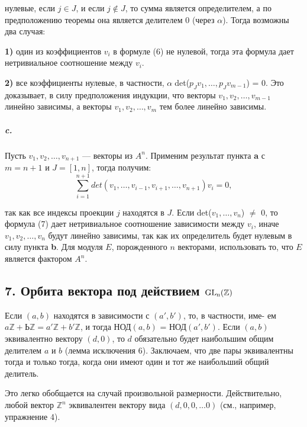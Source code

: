 {\noindent нулевые, если $j \in J$, и если $j \notin J$, то сумма является определителем, а
по предположению теоремы она является делителем 0 (через $\alpha$). Тогда
возможны два случая:

{\bf 1)} один из коэффициентов $v_{i}$ в формуле (6) не нулевой, тогда эта
формула дает нетривиальное соотношение между $v_{i}$.

{\bf 2)} все коэффициенты нулевые, в частности, $\alpha\;$det($p_{J}v_{1},\ldots,p_{J}v_{m-1}$)
= 0. Это доказывает, в силу предположения индукции, что векторы $v_1,v_2,\ldots,v_{m-1}$ линейно зависимы, а векторы $v_1,v_2,\ldots,v_{m}$
тем более линейно зависимы.

\subparagraph{c.} Пусть $v_1,v_2,\ldots,v_{n+1}$ — векторы из $A^{n}$. Применим результат
пункта {\bf a} с $m = n + 1$ и $J = [1,n]$, тогда получим:
\begin{equation}
\sum_{i=1}^{n+1} det(v_1,\ldots,v_{i-1},v_{i+1},\ldots,v_{n+1})v_{i} = 0,
\end{equation}

\newpage


\noindent так как все индексы проекции $j$ находятся в $J$. Если det($v_{1},\ldots,v_{n}$) $\neq$ 0, то формула (7) дает нетривиальное соотношение зависимости между $v_{i}$, иначе $v_1,v_2,\ldots,v_n$ будут линейно зависимы, так как их определитель будет нулевым в силу пункта {\bf b}. Для модуля $E$, порожденного $n$ векторами, использовать то, что $E$ является фактором $A^{n}$.

\subsection{\normalsize{7. Орбита вектора под действием $\rm{GL_n}(\mathbb {Z})$}}

Если $(a, b)$ находятся в зависимости с $(a',b')$, то, в частности, име-\linebreak
ем $a\mathbb {Z}+ Ь\mathbb {Z} = a'\mathbb {Z}+ b'\mathbb {Z}$, и тогда НОД$(a,b)$ = НОД$(a',b')$. Если $(a, b)$ эквивалентно вектору $(d, 0)$, то $d$ обязательно будет наибольшим общим делителем $a$ и $b$ (лемма исключения 6). Заключаем, что две пары эквивалентны тогда и только тогда, когда они имеют один и тот же наибольший общий делитель.

Это легко обобщается на случай произвольной размерности. Действительно, любой вектор $\mathbb {Z}^n$ эквивалентен вектору вида $(d,0,0,\ldots 0)$ (см., например, упражнение 4).

}
